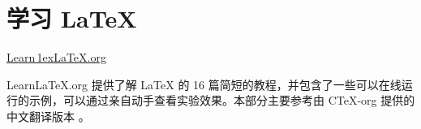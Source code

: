 
\part{学习 \LaTeX{}}

\begin{frame}[plain]
  \vfil
  \begin{center}
    \href{https://learnlatex.org}{
      \rmfamily
      Learn\,\lower1ex\hbox{\Huge\LaTeX{}}.org
    }
  \end{center}
  \vfil
  \begin{center}
    \parbox{0.75\linewidth}{
      Learn\LaTeX{}.org\cite{learnlatex} 提供了解 \LaTeX{} 的 16 篇简短的教程，并包含了一些可以在线运行的示例，可以通过亲自动手查看实验效果。本部分主要参考由 C\TeX{}-org 提供的中文翻译版本 。
    }
  \end{center}
  \vfil
\end{frame}

